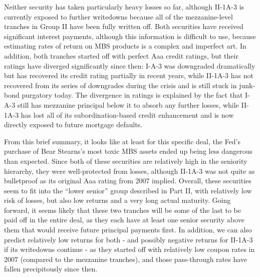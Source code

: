 \documentclass[12pt]{article}
\begin{document}
Neither security has taken particularly heavy losses so far, although II-1A-3 is currently exposed to further writedowns because all of the mezzanine-level tranches in Group II have been fully written off. Both securities have received significant interest payments, although this information is difficult to use, because estimating rates of return on MBS products is a complex and imperfect art. In addition, both tranches started off with perfect Aaa credit ratings, but their ratings have diverged significantly since then: I-A-3 was downgraded dramatically but has recovered its credit rating partially in recent years, while II-1A-3 has not recovered from its series of downgrades during the crisis and is still stuck in junk-bond purgatory today. The divergence in ratings is explained by the fact that I-A-3 still has mezzanine principal below it to absorb any further losses, while II-1A-3 has lost all of its subordination-based credit enhancement and is now directly exposed to future mortgage defaults.

From this brief summary, it looks like at least for this specific deal, the Fed’s purchase of Bear Stearns’s most toxic MBS assets ended up being less dangerous than expected. Since both of these securities are relatively high in the seniority hierarchy, they were well-protected from losses, although II-1A-3 was not quite as bulletproof as its original Aaa rating from 2007 implied. Overall, these securities seem to fit into the “lower senior” group described in Part II, with relatively low risk of losses, but also low returns and a very long actual maturity. Going forward, it seems likely that these two tranches will be some of the last to be paid off in the entire deal, as they each have at least one senior security above them that would receive future principal payments first. In addition, we can also predict relatively low returns for both - and possibly negative returns for II-1A-3 if its writedowns continue - as they started off with relatively low coupon rates in 2007 (compared to the mezzanine tranches), and those pass-through rates have fallen precipitously since then.
\end{document}
